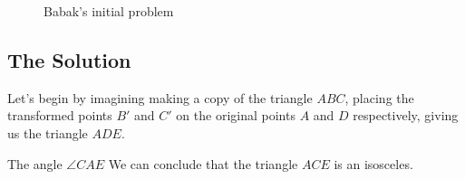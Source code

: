 \documentclass{article}
\theoremstyle{maintheorem}
\begin{document}
\begin{figure}[h]
    \centering
    \caption{Babak's initial problem}
\end{figure}

\subsection{The Solution}

Let's begin by imagining making a copy of the triangle $ABC$, placing the transformed points $B'$ and $C'$ on the original points $A$ and $D$ respectively, giving us the triangle $ADE$.

The angle $\angle CAE$
We can conclude that the triangle $ACE$ is an isosceles.
\end{document}
